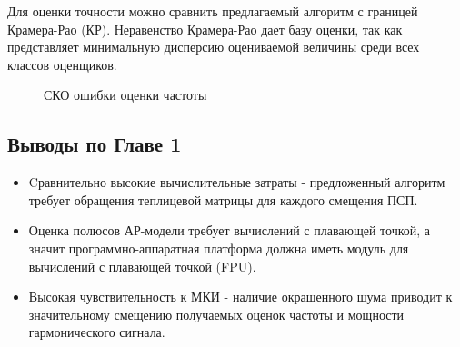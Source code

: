 Для оценки точности можно сравнить предлагаемый алгоритм с границей Крамера-Рао (КР). Неравенство Крамера-Рао дает базу оценки, так
как представляет минимальную дисперсию оцениваемой величины среди всех классов оценщиков.
\begin{figure}[H]
\center{}
	\caption{СКО ошибки оценки частоты}
	\label{pic:crlb_vs_1sat_algo}
\end{figure}

\subsection{Выводы по Главе 1}

\begin{itemize}
\item Cравнительно высокие вычислительные затраты - предложенный алгоритм требует обращения теплицевой матрицы для каждого смещения ПСП.
\item Оценка полюсов АР-модели требует вычислений с плавающей точкой, а значит программно-аппаратная платформа должна иметь модуль для вычислений с плавающей точкой (FPU).
\item Высокая чувствительность к МКИ - наличие окрашенного  шума приводит к значительному смещению получаемых оценок частоты и мощности гармонического сигнала.
\end{itemize}

%

